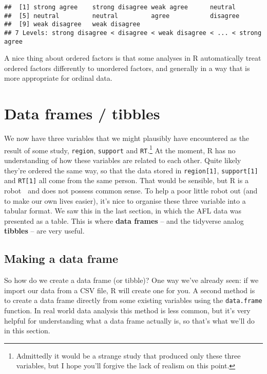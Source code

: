 \documentclass[]{book}
\let\rmarkdownfootnote\footnote%
\def\footnote{\protect\rmarkdownfootnote}
\begin{document}
\begin{verbatim}
##  [1] strong agree    strong disagree weak agree      neutral        
##  [5] neutral         neutral         agree           disagree       
##  [9] weak disagree   weak disagree  
## 7 Levels: strong disagree < disagree < weak disagree < ... < strong agree
\end{verbatim}

A nice thing about ordered factors is that some analyses in R automatically treat ordered factors differently to unordered factors, and generally in a way that is more appropriate for ordinal data.

\hypertarget{data-frames-tibbles}{%
\section{Data frames / tibbles}\label{data-frames-tibbles}}

We now have three variables that we might plausibly have encountered as the result of some study, \texttt{region}, \texttt{support} and \texttt{RT}.\footnote{Admittedly it would be a strange study that produced only these three variables, but I hope you'll forgive the lack of realism on this point.} At the moment, R has no understanding of how these variables are related to each other. Quite likely they're ordered the same way, so that the data stored in \texttt{region{[}1{]}}, \texttt{support{[}1{]}} and \texttt{RT{[}1{]}} all come from the same person. That would be sensible, but R is a robot 🤖 and does not possess common sense. To help a poor little robot out (and to make our own lives easier), it's nice to organise these three variable into a tabular format. We saw this in the last section, in which the AFL data was presented as a table. This is where \textbf{data frames} -- and the tidyverse analog \textbf{tibbles} -- are very useful.

\hypertarget{making-a-data-frame}{%
\subsection{Making a data frame}\label{making-a-data-frame}}

So how do we create a data frame (or tibble)? One way we've already seen: if we import our data from a CSV file, R will create one for you. A second method is to create a data frame directly from some existing variables using the \texttt{data.frame} function. In real world data analysis this method is less common, but it's very helpful for understanding what a data frame actually is, so that's what we'll do in this section.
\end{document}
